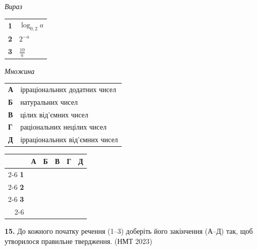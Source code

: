 \documentclass[14pt]{extarticle}
\newcommand{\answerGrid}{
    \begingroup
    \setlength{\tabcolsep}{4pt}
    \renewcommand{\arraystretch}{1.2}
    \small
    \begin{tabular}{r|c|c|c|c|c|}
         \multicolumn{1}{c}{} & \multicolumn{1}{c}{\textbf{А}} & \multicolumn{1}{c}{\textbf{Б}} & \multicolumn{1}{c}{\textbf{В}} & \multicolumn{1}{c}{\textbf{Г}} & \multicolumn{1}{c}{\textbf{Д}} \\ \cline{2-6}
         \textbf{1} & & & & & \\ \cline{2-6}
         \textbf{2} & & & & & \\ \cline{2-6}
         \textbf{3} & & & & & \\ \cline{2-6}
    \end{tabular}
    \endgroup
}
\newcommand{\nmtyear}[1]{\hfill{\small\color{yearcolor}(НМТ #1)}}
\begin{document}
\noindent
\begin{minipage}[t]{0.45\textwidth}
    \textit{Вираз} \par \vspace{0.2cm}
    \begin{tabular}{@{}p{0.5cm} l@{}}
    \textbf{1} & $\log_{0{,}2} a$ \\[0.4cm]
    \textbf{2} & \colorbox{yellow!30}{$2^{-a}$} \\[0.4cm]
    \textbf{3} & $\displaystyle\frac{10}{a}$ \\
    \end{tabular}
\end{minipage}%
\hfill
\begin{minipage}[t]{0.50\textwidth}
    \textit{Множина} \par \vspace{0.2cm}
    \begin{tabular}{@{}p{0.5cm} p{7cm}@{}}
    \textbf{А} & ірраціональних додатних чисел \\[0.2cm]
    \textbf{Б} & натуральних чисел \\[0.2cm]
    \textbf{В} & цілих від'ємних чисел \\[0.2cm]
    \textbf{Г} & раціональних нецілих чисел \\[0.2cm]
    \textbf{Д} & ірраціональних від'ємних чисел \\
    \end{tabular}
\end{minipage}
\vspace{0.3cm}

\answerGrid
\vspace{0.7cm}

\noindent\textbf{15.} До кожного початку речення (1–3) доберіть його закінчення (А–Д) так, щоб утворилося правильне твердження. \nmtyear{2023}
\vspace{0.3cm}
\end{document}
